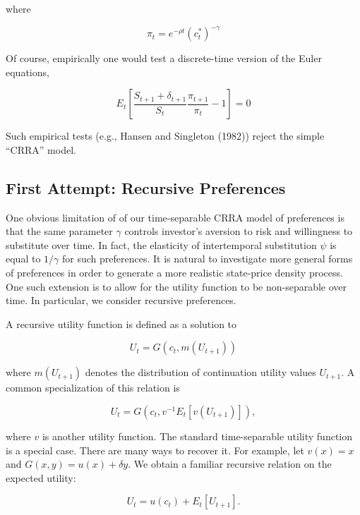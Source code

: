 \documentclass[\topdir/lecture\_notes.tex]{subfiles}
\begin{document}
where

\begin{equation}
\pi_{t}=e^{-\rho t}\left(c_{t}^{*}\right)^{-\gamma}
\end{equation}

Of course, empirically one would test a discrete-time version of the Euler equations,

\begin{equation}
E_{t}\left[\frac{S_{t+1}+\delta_{t+1}}{S_{t}} \frac{\pi_{t+1}}{\pi_{t}}-1\right]=0
\end{equation}

Such empirical tests (e.g., Hansen and Singleton (1982)) reject the simple ``CRRA'' model.

\subsection{First Attempt: Recursive Preferences}
One obvious limitation of of our time-separable CRRA model of preferences is that the same parameter \(\gamma\) controls investor's aversion to risk and willingness to substitute over time. In fact, the elasticity of intertemporal substitution \(\psi\) is equal to \(1 / \gamma\) for such preferences. It is natural to investigate more general forms of preferences in order to generate a more realistic state-price density process. One such extension is to allow for the utility function to be non-separable over time. In particular, we consider recursive preferences.

A recursive utility function is defined as a solution to

\begin{equation}
U_{t}=G\left(c_{t}, m\left(U_{t+1}\right)\right)
\end{equation}

where \(m\left(U_{t+1}\right)\) denotes the distribution of continuation utility values \(U_{t+1}\). A common specialization of this relation is

\begin{equation}
U_{t}=G\left(c_{t}, v^{-1} E_{t}\left[v\left(U_{t+1}\right)\right]\right),
\end{equation}

where \(v\) is another utility function. The standard time-separable utility function is a special case. There are many ways to recover it. For example, let \(v(x)=x\) and \(G(x, y)=u(x)+\delta y\). We obtain a familiar recursive relation on the expected utility:

\begin{equation}
U_{t}=u\left(c_{t}\right)+E_{t}\left[U_{t+1}\right] .
\end{equation}
\end{document}
